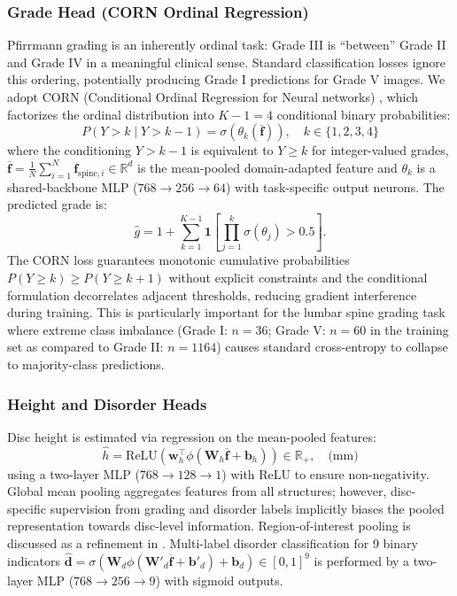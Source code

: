 \documentclass[journal]{IEEEtran}
\begin{document}
\subsubsection{Grade Head (CORN Ordinal Regression)}
Pfirrmann grading is an inherently ordinal task: Grade III is ``between'' Grade II and Grade IV in a meaningful clinical sense. Standard classification losses ignore this ordering, potentially producing Grade I predictions for Grade V images. We adopt CORN (Conditional Ordinal Regression for Neural networks) \cite{shi2022corn}, which factorizes the ordinal distribution into $K{-}1=4$ conditional binary probabilities:
\begin{equation}
    P(Y > k \mid Y > k{-}1) = \sigma\!\left(\theta_k(\overline{\mathbf{f}})\right), \quad k \in \{1,2,3,4\}
    \label{eq:corn}
\end{equation}
where the conditioning $Y > k{-}1$ is equivalent to $Y \geq k$ for integer-valued grades, $\overline{\mathbf{f}} = \frac{1}{N}\sum_{i=1}^{N} \mathbf{f}_{\text{spine},i} \in \mathbb{R}^d$ is the mean-pooled domain-adapted feature and $\theta_k$ is a shared-backbone MLP ($768 \to 256 \to 64$) with task-specific output neurons.
The predicted grade is:
\begin{equation}
    \hat{g} = 1 + \sum_{k=1}^{K-1} \mathbf{1}\!\left[\prod_{j=1}^{k} \sigma(\theta_j) > 0.5\right].
    \label{eq:grade_pred}
\end{equation}
The CORN loss guarantees monotonic cumulative probabilities $P(Y \ge k) \ge P(Y \ge k{+}1)$ without explicit constraints and the conditional formulation decorrelates adjacent thresholds, reducing gradient interference during training.
This is particularly important for the lumbar spine grading task where extreme class imbalance (Grade I: $n=36$; Grade V: $n=60$ in the training set as compared to Grade II: $n=1164$) causes standard cross-entropy to collapse to majority-class predictions.

\subsubsection{Height and Disorder Heads}
Disc height is estimated via regression on the mean-pooled features:
\begin{equation}
    \hat{h} = \text{ReLU}\!\left(\mathbf{w}_h^\top   \phi\!\left(\mathbf{W}_h   \overline{\mathbf{f}} + \mathbf{b}_h\right)\right) \in \mathbb{R}_+, \quad \text{(mm)}
    \label{eq:height}
\end{equation}
using a two-layer MLP ($768 \to 128 \to 1$) with ReLU to ensure non-negativity. Global mean pooling aggregates features from all structures; however, disc-specific supervision from grading and disorder labels implicitly biases the pooled representation towards disc-level information. Region-of-interest pooling is discussed as a refinement in .
Multi-label disorder classification for 9 binary indicators $\hat{\mathbf{d}} = \sigma\!\left(\mathbf{W}_d   \phi(\mathbf{W}'_d   \overline{\mathbf{f}} + \mathbf{b}'_d) + \mathbf{b}_d\right) \in [0,1]^9$ is performed by a two-layer MLP ($768 \to 256 \to 9$) with sigmoid outputs.
\end{document}
